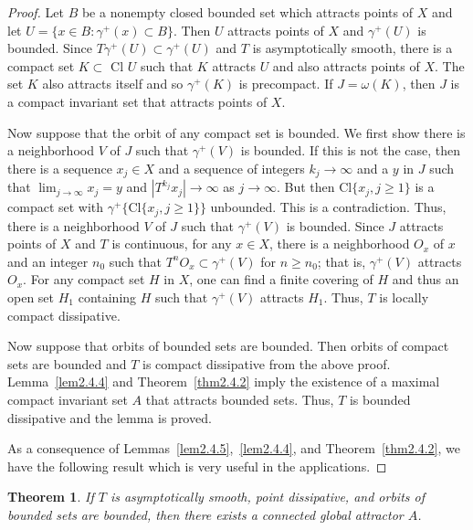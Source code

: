 \documentclass{surv-l}
\theoremstyle{plain}
\newtheorem{theorem}{Theorem}[section]
\theoremstyle{definition}
\numberwithin{equation}{section}
\numberwithin{figure}{chapter}
\begin{document}
\begin{proof}
Let $B$ be a nonempty closed bounded set which attracts points of $X$ and let $U=\{x\in B\!:\gamma^{+}(x)\subset B\}$. Then $U$ attracts points of $X$ and $\gamma^{+}(U)$ is bounded. Since $T\gamma^{+}(U)\subset\gamma^{+}(U)$ and $T$ is asymptotically smooth, there is a compact set $K \subset$ Cl $U$ such that $K$ attracts $U$ and also attracts points of $X$. The set $K$ also attracts itself and so $\gamma^{+}(K)$ is precompact. If $J=\omega(K)$, then $J$ is a compact invariant set that attracts points of $X$.

Now suppose that the orbit of any compact set is bounded. We first show there is a neighborhood $V$ of $J$ such that $\gamma^{+}(V)$ is bounded. If this is not the case, then there is a sequence $x_{j}\in X$ and a sequence of integers $ k_{j}\rightarrow\infty$ and a $y$ in $J$ such that $ \lim_{j\rightarrow\infty}x_{j}=y$ and $|T^{k_{j}}x_{j}|\rightarrow\infty$ as $ j\rightarrow\infty$. But then Cl$\{x_{j}, j\geq 1\}$ is a compact set with $\gamma^{+}\{\mathrm{Cl}\{x_{j}, j\geq 1\}\}$ unbounded. This is a contradiction. Thus, there is a neighborhood $V$ of $J$ such that $\gamma^{+}(V)$ is bounded. Since $J$ attracts points of $X$ and $T$ is continuous, for any $x\in X$, there is a neighborhood $O_{x}$ of $x$ and an integer $n_{0}$ such that $T^{n}O_{x}\subset\gamma^{+}(V)$ for $n\geq n_{0}$; that is, $\gamma^{+}(V)$ attracts $O_{x}$. For any compact set $H$ in $X$, one can find a finite covering of $H$ and thus an open set $H_{1}$ containing $H$ such that $\gamma^{+}(V)$ attracts $H_{1}$. Thus, $T$ is locally compact dissipative.

Now suppose that orbits of bounded sets are bounded. Then orbits of compact sets are bounded and $T$ is compact dissipative from the above proof. Lemma~\ref{lem2.4.4} and Theorem~\ref{thm2.4.2} imply the existence of a maximal compact invariant set $A$ that attracts bounded sets. Thus, $T$ is bounded dissipative and the lemma is proved.

As a consequence of Lemmas~\ref{lem2.4.5},~\ref{lem2.4.4}, and Theorem~\ref{thm2.4.2}, we have the following result which is very useful in the applications.
\end{proof}

\begin{theorem}\label{thm2.4.6} If $T$ is asymptotically smooth, point dissipative, and orbits of bounded sets are bounded, then there exists a connected global attractor $A$.
\end{theorem}
\end{document}
